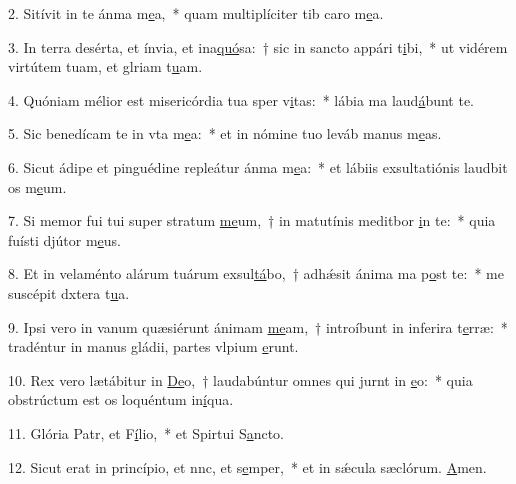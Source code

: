 2. Sitívit in te ánma m\uline{e}a,~* quam multiplíciter tib caro m\uline{e}a.\par 
3. In terra desérta, et ínvia, et ina\uline{quó}sa:~† sic in sancto appári t\uline{i}bi,~* ut vidérem virtútem tuam, et glriam t\uline{u}am.\par 
4. Quóniam mélior est misericórdia tua sper v\uline{i}tas:~* lábia ma laud\uline{á}bunt te.\par 
5. Sic benedícam te in vta m\uline{e}a:~* et in nómine tuo leváb manus m\uline{e}as.\par 
6. Sicut ádipe et pinguédine repleátur ánma m\uline{e}a:~* et lábiis exsultatiónis laudbit os m\uline{e}um.\par 
7. Si memor fui tui super stratum \uline{me}um,~† in matutínis meditbor \uline{i}n te:~* quia fuísti djútor m\uline{e}us.\par 
8. Et in velaménto alárum tuárum exsul\uline{tá}bo,~† adhǽsit ánima ma p\uline{o}st te:~* me suscépit dxtera t\uline{u}a.\par 
9. Ipsi vero in vanum quæsiérunt ánimam \uline{me}am,~† introíbunt in inferira t\uline{e}rræ:~* tradéntur in manus gládii, partes vlpium \uline{e}runt.\par 
10. Rex vero lætábitur in \uline{De}o,~† laudabúntur omnes qui jurnt in \uline{e}o:~* quia obstrúctum est os loquéntum in\uline{í}qua.\par 
11. Glória Patr, et F\uline{í}lio,~* et Spirtui S\uline{a}ncto.\par 
12. Sicut erat in princípio, et nnc, et s\uline{e}mper,~* et in sǽcula sæclórum. \uline{A}men.\par 
